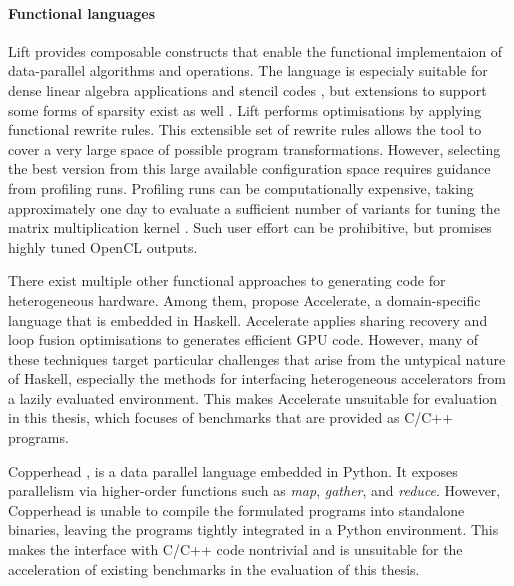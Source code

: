     \paragraph*{Functional languages}
    Lift \citep{steuwer15rewrite} provides composable constructs that enable the
    functional implementaion of data-parallel algorithms and operations.
    The language is especialy suitable for dense linear algebra applications
    \citep{Steuwer:2016:MMB:2968455.2968521} and stencil codes
    \citep{Hagedorn:2018:HPS:3179541.3168824}, but extensions to support
    some forms of sparsity exist as well
    \citep{Pizzuti:2019:PAA:3331553.3342614}.
    Lift performs optimisations by applying functional rewrite rules.
    This extensible set of rewrite rules allows the tool to cover a very large
    space of possible program transformations.
    However, selecting the best version from this large available configuration
    space requires guidance from profiling runs.
    Profiling runs can be computationally expensive, taking approximately
    one day to evaluate a sufficient number of variants for tuning the matrix
    multiplication kernel \citep{Steuwer:2016:MMB:2968455.2968521}.
    Such user effort can be prohibitive, but promises highly tuned OpenCL
    outputs.

    There exist multiple other functional approaches to generating code for
    heterogeneous hardware.
    Among them, \citet{chakravarty11accelerating,mcdonell13optimising} propose
    Accelerate, a domain-specific language that is embedded in Haskell.
    Accelerate applies sharing recovery and loop fusion optimisations to
    generates efficient GPU code.
    However, many of these techniques target particular challenges that arise
    from the untypical nature of Haskell, especially the methods for interfacing
    heterogeneous accelerators from a lazily evaluated environment.
    This makes Accelerate unsuitable for evaluation in this thesis, which
    focuses of benchmarks that are provided as C/C++ programs.


    Copperhead \citep{catanzaro11copperhead}, is a data parallel language
    embedded in Python.
    It exposes parallelism via higher-order functions such as {\it map},
    {\it gather}, and {\it reduce}.
    However, Copperhead is unable to compile the formulated programs into
    standalone binaries, leaving the programs tightly integrated in a Python
    environment.
    This makes the interface with C/C++ code nontrivial and is unsuitable for
    the acceleration of existing benchmarks in the evaluation of this thesis.

